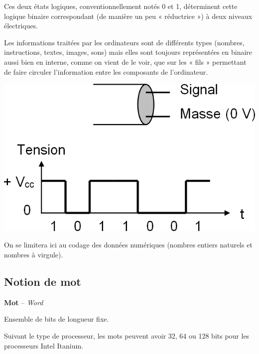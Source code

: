 \documentclass[10pt,fleqn]{article} %
\begin{document}
\begin{minipage}[c]{.45\linewidth}
Ces deux états logiques, conventionnellement notés 0 et 1, déterminent cette logique binaire correspondant (de manière un peu « réductrice ») à deux niveaux électriques.

Les informations traitées par les ordinateurs sont de différents types (nombres, instructions, textes, images, sons) mais elles sont toujours représentées en binaire aussi bien en interne, comme on vient de le voir, que sur les « fils » permettant de faire circuler l'information entre les composants de l'ordinateur. 

\end{minipage}\hfill
\begin{minipage}[c]{.45\linewidth}
\begin{center}
\includegraphics[width=.9\textwidth]{images/transmission_classique}
\end{center}
\end{minipage}



\begin{rem}
On se limitera ici au codage des données numériques (nombres entiers naturels et nombres à virgule).
\end{rem}

\subsection{Notion de mot}

\begin{defi}
\textbf{Mot} -- \textit{Word}

Ensemble de bits de longueur fixe. 

Suivant le type de processeur, les mots peuvent avoir 32, 64 ou 128 bits pour les processeurs Intel Itanium.
\end{defi}
\end{document}
